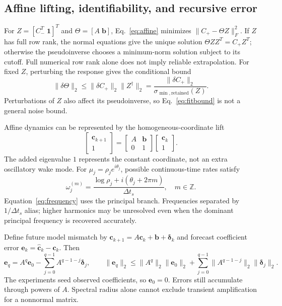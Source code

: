 \documentclass[11pt,a4paper]{article}
\begin{document}
\subsection{Affine lifting, identifiability, and recursive error}
For $Z=[C_-^T\;\bm1]^T$ and $\Theta=[A\;\bm b]$, Eq.~\eqref{eq:affine} minimizes $\|C_+-\Theta Z\|_F^2$. If $Z$ has full row rank, the normal equations give the unique solution $\Theta Z Z^T=C_+Z^T$; otherwise the pseudoinverse chooses a minimum-norm solution subject to its cutoff. Full numerical row rank alone does not imply reliable extrapolation. For fixed $Z$, perturbing the response gives the conditional bound
\begin{equation}
 \|\delta\Theta\|_2\leq\|\delta C_+\|_2\|Z^\dagger\|_2
 =\frac{\|\delta C_+\|_2}{\sigma_{\min,\mathrm{retained}}(Z)}.\label{eq:fitbound}
\end{equation}
Perturbations of $Z$ also affect its pseudoinverse, so Eq.~\eqref{eq:fitbound} is not a general noise bound.

Affine dynamics can be represented by the homogeneous-coordinate lift
\begin{equation}
 \begin{bmatrix}\bm c_{k+1}\\1\end{bmatrix}
 =\begin{bmatrix}A&\bm b\\0&1\end{bmatrix}
 \begin{bmatrix}\bm c_k\\1\end{bmatrix}.\label{eq:augmented}
\end{equation}
The added eigenvalue $1$ represents the constant coordinate, not an extra oscillatory wake mode. For $\mu_j=\rho_j e^{i\theta_j}$, possible continuous-time rates satisfy
\begin{equation}
 \omega_j^{(m)}=\frac{\log\rho_j+i(\theta_j+2\pi m)}{\Delta t_s},
 \quad m\in\mathbb Z.\label{eq:alias}
\end{equation}
Equation~\eqref{eq:frequency} uses the principal branch. Frequencies separated by $1/\Delta t_s$ alias; higher harmonics may be unresolved even when the dominant principal frequency is recovered accurately.

Define future model mismatch by $\bm c_{k+1}=A\bm c_k+\bm b+\bm\delta_k$ and forecast coefficient error $\bm e_k=\widehat{\bm c}_k-\bm c_k$. Then
\begin{equation}
 \bm e_q=A^q\bm e_0-\sum_{j=0}^{q-1}A^{q-1-j}\bm\delta_j,\qquad
 \|\bm e_q\|_2\leq\|A^q\|_2\|\bm e_0\|_2+
 \sum_{j=0}^{q-1}\|A^{q-1-j}\|_2\|\bm\delta_j\|_2.\label{eq:errorprop}
\end{equation}
The experiments seed observed coefficients, so $\bm e_0=0$. Errors still accumulate through powers of $A$. Spectral radius alone cannot exclude transient amplification for a nonnormal matrix.
\end{document}
